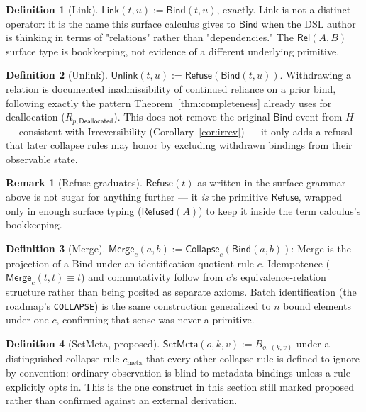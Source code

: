 \documentclass[12pt]{article}
\newcommand{\Merge}{\mathsf{Merge}}
\newcommand{\Rel}[2]{\mathsf{Rel}(#1,#2)}
\newcommand{\Refused}[1]{\mathsf{Refused}(#1)}
\theoremstyle{definition}
\newtheorem{definition}{Definition}
\newtheorem{remark}{Remark}
\newcommand{\LinkOp}{\mathsf{Link}}
\newcommand{\UnlinkOp}{\mathsf{Unlink}}
\newcommand{\RefuseOp}{\mathsf{Refuse}}
\newcommand{\CollapseOp}{\mathsf{Collapse}}
\newcommand{\SetMetaOp}{\mathsf{SetMeta}}
\newcommand{\BindOp}{\mathsf{Bind}}
\begin{document}
\begin{definition}[Link]
$\LinkOp(t,u) := \BindOp(t,u)$, exactly. Link is not a distinct operator: it is the name this surface calculus gives to $\BindOp$ when the DSL author is thinking in terms of "relations" rather than "dependencies." The $\Rel{A}{B}$ surface type is bookkeeping, not evidence of a different underlying primitive.
\end{definition}

\begin{definition}[Unlink]
$\UnlinkOp(t,u) := \RefuseOp(\BindOp(t,u))$. Withdrawing a relation is documented inadmissibility of continued reliance on a prior bind, following exactly the pattern Theorem~\ref{thm:completeness} already uses for deallocation ($R_{p,\mathsf{Deallocated}}$). This does not remove the original $\BindOp$ event from $H$ — consistent with Irreversibility (Corollary~\ref{cor:irrev}) — it only adds a refusal that later collapse rules may honor by excluding withdrawn bindings from their observable state.
\end{definition}

\begin{remark}[Refuse graduates]
$\RefuseOp(t)$ as written in the surface grammar above is not sugar for anything further — it \emph{is} the primitive $\RefuseOp$, wrapped only in enough surface typing ($\Refused{A}$) to keep it inside the term calculus's bookkeeping.
\end{remark}

\begin{definition}[Merge]
\label{def:merge-sugar}
$\Merge_c(a,b) := \CollapseOp_c(\BindOp(a,b))$: Merge is the projection of a Bind under an identification-quotient rule $c$. Idempotence ($\Merge_c(t,t)\equiv t$) and commutativity follow from $c$'s equivalence-relation structure rather than being posited as separate axioms. Batch identification (the roadmap's \texttt{COLLAPSE}) is the same construction generalized to $n$ bound elements under one $c$, confirming that sense was never a primitive.
\end{definition}

\begin{definition}[SetMeta, proposed]
$\SetMetaOp(o, k, v) := B_{o,\,(k,v)}$ under a distinguished collapse rule $c_\mathrm{meta}$ that every other collapse rule is defined to ignore by convention: ordinary observation is blind to metadata bindings unless a rule explicitly opts in. This is the one construct in this section still marked proposed rather than confirmed against an external derivation.
\end{definition}
\end{document}
